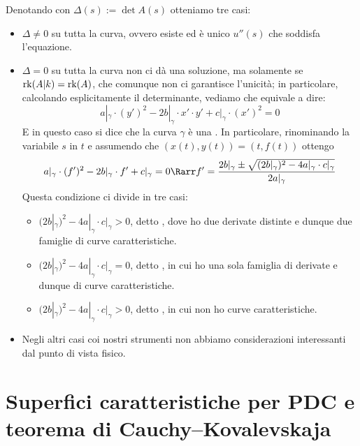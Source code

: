 \documentclass{article}
\begin{document}
Denotando con $\Delta(s) := \det A(s)$ otteniamo tre casi:\begin{itemize}
    \item $\Delta \neq 0$ su tutta la curva, ovvero esiste ed è unico $u''(s)$ che soddisfa l'equazione.
    \item $\Delta = 0$ su tutta la curva  non ci dà una soluzione, ma solamente se $\operatorname{rk}(A|k) = \operatorname{rk}(A)$, che comunque non ci garantisce l'unicità; in particolare, calcolando esplicitamente il determinante, vediamo che equivale a dire:
    \[ a|_\gamma \cdot (y')^2 - 2b|_\gamma \cdot x' \cdot y' + c|_\gamma \cdot (x')^2=0  \]
    E in questo caso si dice che la curva $\gamma$ è una . In particolare, rinominando la variabile $s$ in $t$ e assumendo che  $(x(t),y(t)) = (t, f(t))$ ottengo 
    \[ a|_\gamma \cdot (f')^2 - 2b|_\gamma \cdot f' + c|_\gamma =0 \Rarr f' = \frac{ 2b|_\gamma \pm \sqrt{(2b|_\gamma)^2 - 4 a|_\gamma \cdot c|_\gamma} }{2a|_\gamma} \]
    Questa condizione ci divide in tre casi:\begin{itemize}
        \item $(2b|_\gamma)^2 - 4 a|_\gamma \cdot c|_\gamma > 0$, detto , dove ho due derivate distinte e dunque due famiglie di curve caratteristiche.
        \item $(2b|_\gamma)^2 - 4 a|_\gamma \cdot c|_\gamma = 0$, detto , in cui ho una sola famiglia di derivate e dunque di curve caratteristiche.
        \item $(2b|_\gamma)^2 - 4 a|_\gamma \cdot c|_\gamma > 0$, detto , in cui non ho curve caratteristiche.
    \end{itemize}
    \item Negli altri casi coi nostri strumenti non abbiamo considerazioni interessanti dal punto di vista fisico.
\end{itemize}

\section{Superfici caratteristiche per PDC e teorema di Cauchy--Kovalevskaja}
\end{document}
